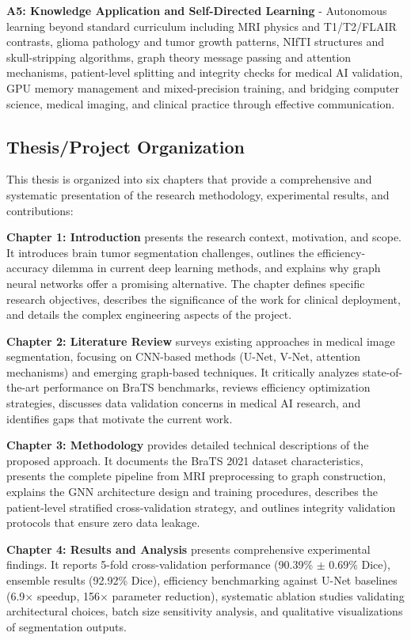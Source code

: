 \textbf{A5: Knowledge Application and Self-Directed Learning} - Autonomous learning beyond standard curriculum including MRI physics and T1/T2/FLAIR contrasts, glioma pathology and tumor growth patterns, NIfTI structures and skull-stripping algorithms, graph theory message passing and attention mechanisms, patient-level splitting and integrity checks for medical AI validation, GPU memory management and mixed-precision training, and bridging computer science, medical imaging, and clinical practice through effective communication.

 
\subsection{Thesis/Project Organization}

This thesis is organized into six chapters that provide a comprehensive and systematic presentation of the research methodology, experimental results, and contributions:

\textbf{Chapter 1: Introduction} presents the research context, motivation, and scope. It introduces brain tumor segmentation challenges, outlines the efficiency-accuracy dilemma in current deep learning methods, and explains why graph neural networks offer a promising alternative. The chapter defines specific research objectives, describes the significance of the work for clinical deployment, and details the complex engineering aspects of the project.

\textbf{Chapter 2: Literature Review} surveys existing approaches in medical image segmentation, focusing on CNN-based methods (U-Net, V-Net, attention mechanisms) and emerging graph-based techniques. It critically analyzes state-of-the-art performance on BraTS benchmarks, reviews efficiency optimization strategies, discusses data validation concerns in medical AI research, and identifies gaps that motivate the current work.

\textbf{Chapter 3: Methodology} provides detailed technical descriptions of the proposed approach. It documents the BraTS 2021 dataset characteristics, presents the complete pipeline from MRI preprocessing to graph construction, explains the GNN architecture design and training procedures, describes the patient-level stratified cross-validation strategy, and outlines integrity validation protocols that ensure zero data leakage.

\textbf{Chapter 4: Results and Analysis} presents comprehensive experimental findings. It reports 5-fold cross-validation performance (90.39\% $\pm$ 0.69\% Dice), ensemble results (92.92\% Dice), efficiency benchmarking against U-Net baselines (6.9$\times$ speedup, 156$\times$ parameter reduction), systematic ablation studies validating architectural choices, batch size sensitivity analysis, and qualitative visualizations of segmentation outputs.

